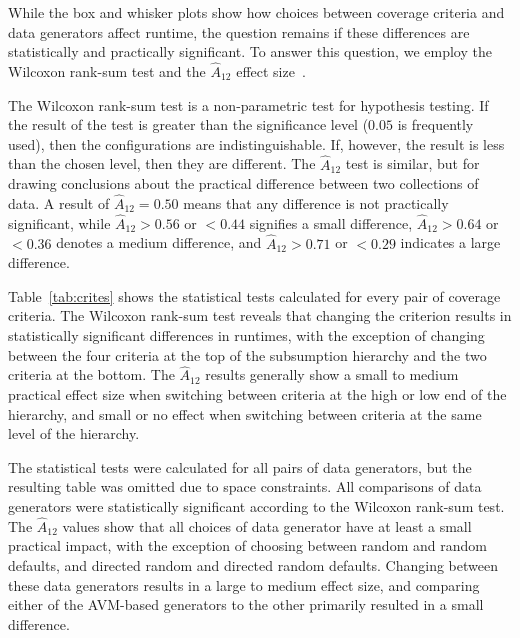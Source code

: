 
While the box and whisker plots show how choices between coverage criteria and data generators affect runtime, the
question remains if these differences are statistically and practically significant. To answer this question, we employ
the Wilcoxon rank-sum test and the $\hat{A}_{12}$ effect size~\cite{mcminn2015}.

The Wilcoxon rank-sum test is a non-parametric test for hypothesis testing.  If the result of the test is greater than
the significance level ($0.05$ is frequently used), then the configurations are indistinguishable.  If, however, the
result is less than the chosen level, then they are different.  The $\hat{A}_{12}$ test is similar, but for drawing
conclusions about the practical difference between two collections of data.  A result of $\hat{A}_{12}=0.50$ means that
any difference is not practically significant, while $\hat{A}_{12}>0.56$ or $<0.44$ signifies a small difference,
$\hat{A}_{12}>0.64$ or $<0.36$ denotes a medium difference, and $\hat{A}_{12}>0.71$ or $<0.29$ indicates a large
difference.

Table~\ref{tab:crites} shows the statistical tests calculated for every pair of coverage criteria. The Wilcoxon
rank-sum test reveals that changing the criterion results in statistically significant differences in runtimes, with the
exception of changing between the four criteria at the top of the subsumption hierarchy and the two criteria at the
bottom.  The $\hat{A}_{12}$ results generally show a small to medium practical effect size when switching between
criteria at the high or low end of the hierarchy, and small or no effect when switching between criteria at the same
level of the hierarchy.

The statistical tests were calculated for all pairs of data generators, but the resulting table was omitted due to space
constraints. All comparisons of data generators were statistically significant according to the Wilcoxon rank-sum test.
The $\hat{A}_{12}$ values show that all choices of data generator have at least a small practical impact, with the
exception of choosing between random and random defaults, and directed random and directed random defaults.  Changing
between these data generators results in a large to medium effect size, and comparing either of the AVM-based
generators to the other primarily resulted in a small difference.
